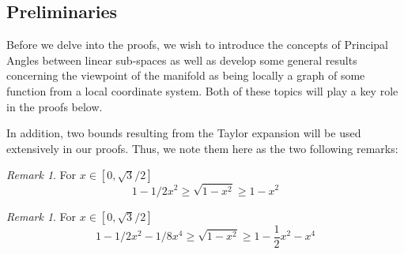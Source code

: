 \documentclass[12pt]{article}
\theoremstyle{remark}
\newtheorem{remark}[Theorem]{Remark}
\begin{document}
\begin{appendices}




\section{Preliminaries}
Before we delve into the proofs, we wish to introduce the concepts of Principal Angles between linear sub-spaces \cite{jordan1875essai,bjorck1973numerical} as well as develop some general results concerning the viewpoint of the manifold as being locally a graph of some function from a local coordinate system.
Both of these topics will play a key role in the proofs below.

In addition, two bounds resulting from the Taylor expansion will be used extensively in our proofs.
Thus, we note them here as the two following remarks:

\begin{remark}\label{rem:taylor_sqrt1-x2_clean}
For $x\in[0,\sqrt{3}/2]$
\begin{equation}\label{eq:Taylor2ndOrder}
    1-1/2x^2 \geq \sqrt{1 - x^2} \geq 1-x^2
\end{equation}
\end{remark}
\begin{remark}\label{rem:taylor2_sqrt1-x2_clean}
For $x\in[0,\sqrt{3}/2]$
\begin{equation}
1-1/2x^2-1/8x^4 \geq \sqrt{1 - x^2} \geq 1-\frac{1}{2}x^2 - x^4    
\end{equation}
\end{remark}


\end{appendices}
\end{document}
